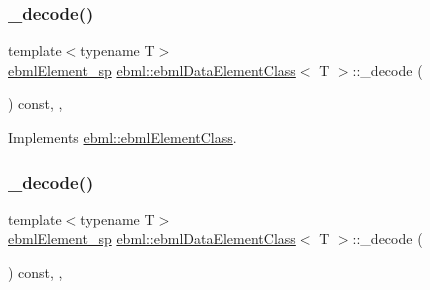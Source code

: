 \subsubsection{\texorpdfstring{\+\_\+decode()}{\_decode()}\hspace{0.1cm}{\footnotesize\ttfamily [1/2]}}
{\footnotesize\ttfamily template$<$typename T$>$ \\
\mbox{\hyperlink{namespaceebml_adad533b7705a16bb360fe56380c5e7be}{ebml\+Element\+\_\+sp}} \mbox{\hyperlink{classebml_1_1ebmlDataElementClass}{ebml\+::ebml\+Data\+Element\+Class}}$<$ T $>$\+::\+\_\+decode (\begin{DoxyParamCaption}\item[{const \mbox{\hyperlink{classebml_1_1parseString}{parse\+String}} \&}]{ }\end{DoxyParamCaption}) const\hspace{0.3cm}{\ttfamily [override]}, {\ttfamily [protected]}, {\ttfamily [virtual]}}



Implements \mbox{\hyperlink{classebml_1_1ebmlElementClass_aa6bf675de4918fd7b553d141871a2ede}{ebml\+::ebml\+Element\+Class}}.

\mbox{\label{classebml_1_1ebmlDataElementClass_ac0b070ab767aecb9387f9c0e412e8136}} 
\subsubsection{\texorpdfstring{\+\_\+decode()}{\_decode()}\hspace{0.1cm}{\footnotesize\ttfamily [2/2]}}
{\footnotesize\ttfamily template$<$typename T$>$ \\
\mbox{\hyperlink{namespaceebml_adad533b7705a16bb360fe56380c5e7be}{ebml\+Element\+\_\+sp}} \mbox{\hyperlink{classebml_1_1ebmlDataElementClass}{ebml\+::ebml\+Data\+Element\+Class}}$<$ T $>$\+::\+\_\+decode (\begin{DoxyParamCaption}\item[{const \mbox{\hyperlink{classebml_1_1parseFile}{parse\+File}} \&}]{ }\end{DoxyParamCaption}) const\hspace{0.3cm}{\ttfamily [override]}, {\ttfamily [protected]}, {\ttfamily [virtual]}}



